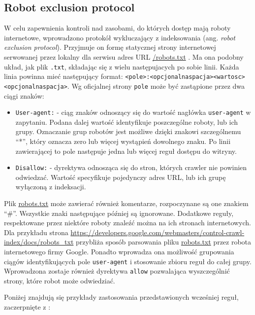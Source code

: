 
\subsection{Robot exclusion protocol}
\label{subsec:robotExcl}

W celu zapewnienia kontroli nad zasobami, do których dostęp mają roboty internetowe, wprowadzono protokół wykluczający z indeksowania
(ang. \emph{robot exclusion protocol}). Przyjmuje on formę statycznej strony internetowej serwowanej przez lokalny dla serwisu adres URL 
\url{/robots.txt} \cite{robotsTxt}. Ma ona podobny układ, jak plik \texttt{.txt}, składając się z wielu
następujacych po sobie linii. Każda linia powinna mieć następujący format: \texttt{<pole>:<opcjonalnaspacja><wartosc><opcjonalnaspacja>}.
Wg oficjalnej strony \cite{robotsTxt} \texttt{pole} może być zastąpione przez dwa ciągi znaków:
\begin{itemize}
    \item \texttt{User-agent:} - ciąg znaków odnoszący się do wartość nagłówka \texttt{user-agent} w zapytaniu. Podana dalej wartość identyfikuje
     poszczególne roboty, lub ich grupy. Oznaczanie grup robotów jest możliwe dzięki znakowi szczególnemu ``*'', który oznacza zero lub więcej
     wystąpień dowolnego znaku. Po linii zawierającej to pole następuje jedna lub więcej reguł dostępu do witryny. 
    \item \texttt{Disallow:} - dyrektywa odnosząca się do stron, których crawler nie powinien odwiedzać. Wartość specyfikuje pojedynczy adres URL, lub
     ich grupę wyłączoną z indeksacji.
\end{itemize}
Plik \url{robots.txt} może zawierać również komentarze, rozpoczynane są one znakiem ``\#''. Wszystkie znaki następujące później są ignorowane.
Dodatkowe reguły, respektowane przez niektóre roboty znaleźć można na ich stronach internetowych. Dla przykładu strona \url{https://developers.google.com/webmasters/control-crawl-index/docs/robots_txt}
przybliża sposób parsowania pliku \url{robots.txt} przez robota internetowego firmy Google. Ponadto wprowadza ona możliwość grupowania ciągów identyfikujących
pole \texttt{user-agent} i stosowanie zbioru reguł do całej grupy. Wprowadzona zostaje również dyrektywa \texttt{allow} pozwalająca wyszczególnić
strony, które robot może odwiedziać.

Poniżej znajdują się przykłady zastosowania przedstawionych wcześniej reguł, zaczerpnięte z \cite{robotsTxt}:

